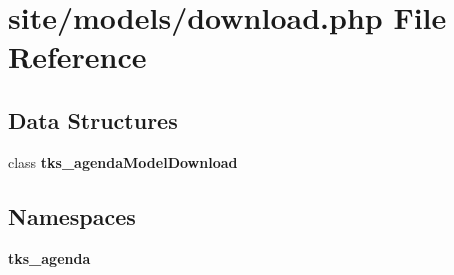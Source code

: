 \section{site/models/download.php File Reference}
\label{site_2models_2download_8php}
\subsection*{Data Structures}
\begin{DoxyCompactItemize}
\item 
class \textbf{ tks\+\_\+agenda\+Model\+Download}
\end{DoxyCompactItemize}
\subsection*{Namespaces}
\begin{DoxyCompactItemize}
\item 
 \textbf{ tks\+\_\+agenda}
\end{DoxyCompactItemize}
